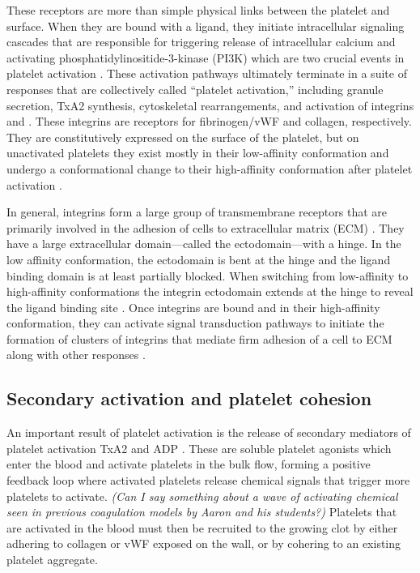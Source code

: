 These receptors are more than simple physical links between the
platelet and surface. When they are bound with a ligand, they initiate
intracellular signaling cascades that are responsible for triggering
release of intracellular calcium and activating
phosphatidylinositide-3-kinase (PI3K) which are two crucial events in
platelet activation \cite{Bye2016,Du2007,Senis2014}. These activation
pathways ultimately terminate in a suite of responses that are
collectively called ``platelet activation,'' including granule
secretion, TxA2 synthesis, cytoskeletal rearrangements, and activation
of integrins  and . These integrins are
receptors for fibrinogen/vWF and collagen, respectively. They are
constitutively expressed on the surface of the platelet, but on
unactivated platelets they exist mostly in their low-affinity
conformation and undergo a conformational change to their
high-affinity conformation after platelet activation
\cite{Qiu2015,Shattil1998,Shattil2010}.
		
In general, integrins form a large group of transmembrane receptors
that are primarily involved in the adhesion of cells to extracellular
matrix (ECM) \cite{Giancotti1999}. They have a large extracellular
domain---called the ectodomain---with a hinge. In the low affinity
conformation, the ectodomain is bent at the hinge and the ligand
binding domain is at least partially blocked. When switching from
low-affinity to high-affinity conformations the integrin ectodomain
extends at the hinge to reveal the ligand binding site
\cite{Campbell2011,Qiu2015,Shattil1998}. Once integrins are bound and
in their high-affinity conformation, they can activate signal
transduction pathways to initiate the formation of clusters of
integrins that mediate firm adhesion of a cell to ECM along with other
responses \cite{Hynes2002,Li2010,Shattil1998,Shattil2010}.

\subsection{Secondary activation and platelet cohesion}
\label{sec:second-wave-activ}

An important result of platelet activation is the release of secondary
mediators of platelet activation TxA2 and ADP \cite{Bye2016}. These
are soluble platelet agonists which enter the blood and activate
platelets in the bulk flow, forming a positive feedback loop where
activated platelets release chemical signals that trigger more
platelets to activate. \emph{(Can I say something about a wave of activating
chemical seen in previous coagulation models by Aaron and his
students?)} Platelets that are activated in the blood must
then be recruited to the growing clot by either adhering to collagen
or vWF exposed on the wall, or by cohering to an existing platelet
aggregate. 

